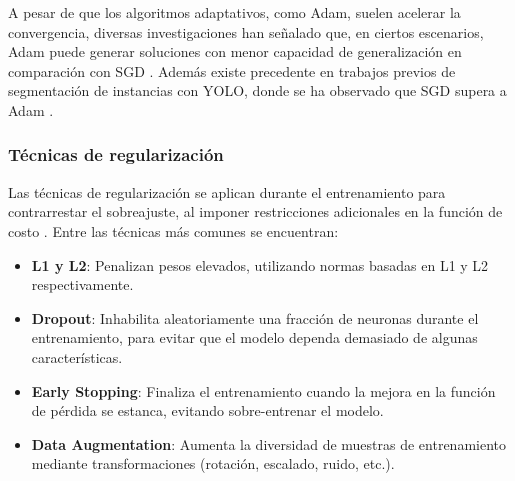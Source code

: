 
A pesar de que los algoritmos adaptativos, como Adam, suelen acelerar la convergencia, diversas investigaciones han señalado que, en ciertos escenarios, Adam puede generar soluciones con menor capacidad de generalización en comparación con SGD \cite{Keskar2017, Deng2009, Goyal2017, He2016}. Además existe precedente en trabajos previos de segmentación de instancias con YOLO, donde se ha observado que SGD supera a Adam \cite{Guerrero2024, Lopez2024}.

\subsubsection{Técnicas de regularización}

Las técnicas de regularización se aplican durante el entrenamiento para contrarrestar el sobreajuste, al imponer restricciones adicionales en la función de costo \cite{Goodfellow-et-al-2016}. Entre las técnicas más comunes se encuentran:
 
\begin{itemize}
\setlength\itemsep{-0.3em}
    \item \textbf{L1 y L2}: Penalizan pesos elevados, utilizando normas basadas en L1 y L2 respectivamente.
    \item \textbf{Dropout}: Inhabilita aleatoriamente una fracción de neuronas durante el entrenamiento, para evitar que el modelo dependa demasiado de algunas características.
    \item \textbf{Early Stopping}: Finaliza el entrenamiento cuando la mejora en la función de pérdida se estanca, evitando sobre-entrenar el modelo.
    \item \textbf{Data Augmentation}: Aumenta la diversidad de muestras de entrenamiento mediante transformaciones (rotación, escalado, ruido, etc.).
\end{itemize}

